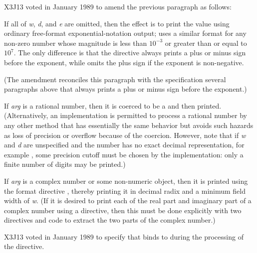 \begin{flushdesc}
\begin{new}
X3J13 voted in January 1989
to amend the previous paragraph as follows:

If all of {\it w}, {\it d}, and {\it e} are omitted, then the effect is to print
the value using ordinary free-format exponential-notation output;
 uses a similar format for any non-zero number whose magnitude
is less than $10^{-3}$ or greater than or equal to $10^7$.
The only difference is that the  directive always prints
a plus or minus sign before the exponent, while  omits the plus sign
if the exponent is non-negative.

(The amendment reconciles this paragraph with the specification several
paragraphs above that  always prints
a plus or minus sign before the exponent.)
\end{new}

If {\it arg} is a rational number, then it is coerced to be a 
and then printed.  (Alternatively, an implementation is permitted to
process a rational number by any other method that has essentially the
same behavior but avoids such hazards as loss of precision or overflow
because of the coercion.  However, note that if {\it w} and {\it d} are
unspecified and the number has no exact decimal representation,
for example , some precision cutoff must be chosen
by the implementation: only a finite number of digits may be printed.)

If {\it arg} is a complex number or some non-numeric
object, then it is printed using the format directive ,
thereby printing it in decimal radix and a minimum field width of {\it w}.
(If it is desired to print each of the real part and imaginary part
of a complex number using a  directive, then this must
be done explicitly with two  directives and code to
extract the two parts of the complex number.)

\begin{new}
X3J13 voted in January 1989
to specify that  binds  to 
during the processing of the  directive.
\end{new}


\end{flushdesc}
